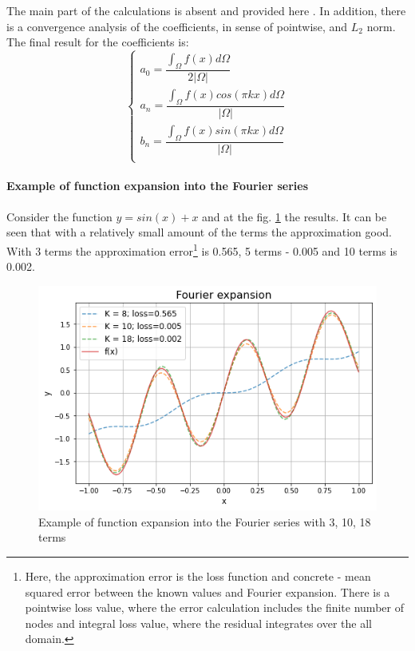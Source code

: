 The main part of the calculations is absent and provided here \cite{fourierintro}. In addition, there is a convergence analysis of the coefficients, in sense of pointwise, and $L_2$ norm. The final result for the coefficients is:
\begin{equation}
	\begin{cases}
		a_0 = \dfrac{{\displaystyle \int_{\Omega}} f(x) d\Omega }{2 | \Omega |} \\[20pt]
		a_n = \dfrac{{\displaystyle \int_{\Omega}} f(x) cos(\pi k x) d\Omega}{| \Omega |} \\[20pt]
		b_n = \dfrac{{\displaystyle \int_{\Omega}} f(x) sin(\pi k x) d\Omega}{| \Omega |} \\[20pt]
	\end{cases}
\end{equation}

\paragraph{Example of function expansion into the Fourier series} 
Consider the function $y = sin(x) + x$ and at the fig. \ref{fig:fourier_demo} the results. It can be seen that with a relatively small amount of the terms the approximation good. With 3 terms the approximation error\footnote{Here, the approximation error is the loss function and concrete - mean squared error between the known values and Fourier expansion. There is a pointwise loss value, where the error calculation includes the finite number of nodes and integral loss value, where the residual integrates over the all domain.} is 0.565, 5 terms - 0.005 and 10 terms is 0.002.
\begin{figure}[h]
	\centering
	\includegraphics[width=0.65 \textwidth]{images/chapter2/fourier_demo.png}
	\caption{Example of function expansion into the Fourier series with 3, 10, 18 terms}
	\label{fig:fourier_demo}
\end{figure}

